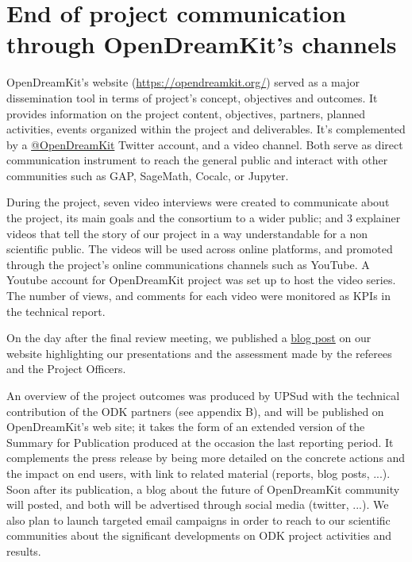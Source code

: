 \documentclass{deliverablereport}
\begin{document}

\section{End of project communication through OpenDreamKit's channels}

OpenDreamKit's website (\url{https://opendreamkit.org/}) served as a
major dissemination tool in terms of project’s concept, objectives and
outcomes. It provides information on the project content, objectives,
partners, planned activities, events organized within the project and
deliverables. It's complemented by a
\href{https://twitter.com/OpenDreamKit}{@OpenDreamKit} Twitter
account, and a video channel. Both serve as direct communication
instrument to reach the general public and interact with other
communities such as GAP, SageMath, Cocalc, or Jupyter.

During the project, seven video interviews were created to communicate
about the project, its main goals and the consortium to a wider
public; and 3 explainer videos that tell the story of our project in a
way understandable for a non scientific public. The videos will be
used across online platforms, and promoted through the project’s
online communications channels such as YouTube. A Youtube account for
OpenDreamKit project was set up to host the video series. The number
of views, and comments for each video were monitored as KPIs in the
technical report.

On the day after the final review meeting, we published a
\href{https://opendreamkit.org/2019/10/30/final-project-review/}{blog post}
on our website highlighting our presentations and the assessment made
by the referees and the Project Officers.

An overview of the project outcomes was produced by UPSud with the
technical contribution of the ODK partners (see appendix B), and
will be published on OpenDreamKit's web site; it takes the form of an
extended version of the Summary for Publication produced at the
occasion the last reporting period. It complements the press release
by being more detailed on the concrete actions and the impact on end
users, with link to related material (reports, blog posts, ...). Soon
after its publication, a blog about the future of OpenDreamKit
community will posted, and both will be advertised through social
media (twitter, ...). We also plan to launch targeted email campaigns
in order to reach to our scientific communities about the significant
developments on ODK project activities and results.
\end{document}
